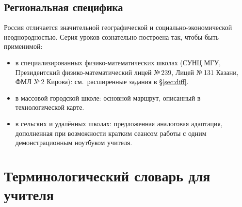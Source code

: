 \documentclass[12pt,a4paper]{scrartcl}
\begin{document}
\subsection{Региональная специфика}

Россия отличается значительной географической и социально-экономической неоднородностью. Серия уроков сознательно построена так, чтобы быть применимой:

\begin{itemize}[leftmargin=1.3em,itemsep=0.15em,topsep=0.3em]
  \item в специализированных физико-математических школах (СУНЦ МГУ, Президентский физико-математический лицей №\,239, Лицей №\,131 Казани, ФМЛ №\,2 Кирова): см.~расширенные задания в §\ref{sec:diff}.
  \item в массовой городской школе: основной маршрут, описанный в технологической карте.
  \item в сельских и удалённых школах: предложенная аналоговая адаптация, дополненная при возможности кратким сеансом работы с одним демонстрационным ноутбуком учителя.
\end{itemize}

\newpage
\section{Терминологический словарь для учителя}\label{ap:glos}
\end{document}
